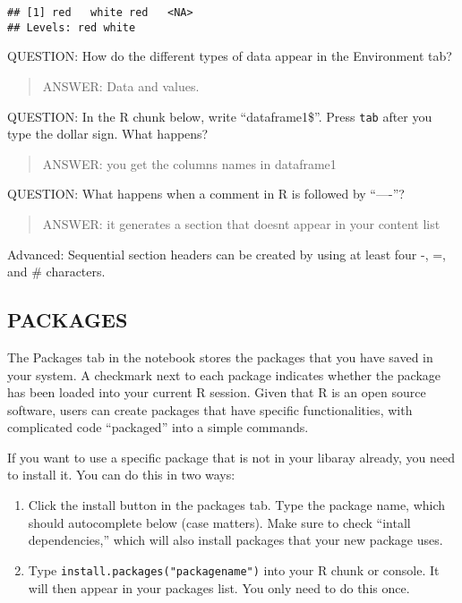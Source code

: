 \documentclass[]{article}
\begin{document}
\begin{verbatim}
## [1] red   white red   <NA> 
## Levels: red white
\end{verbatim}

QUESTION: How do the different types of data appear in the Environment
tab?

\begin{quote}
ANSWER: Data and values.
\end{quote}

QUESTION: In the R chunk below, write ``dataframe1\$''. Press
\texttt{tab} after you type the dollar sign. What happens?

\begin{quote}
ANSWER: you get the columns names in dataframe1
\end{quote}

QUESTION: What happens when a comment in R is followed by ``----''?

\begin{quote}
ANSWER: it generates a section that doesnt appear in your content list
\end{quote}

Advanced: Sequential section headers can be created by using at least
four -, =, and \# characters.

\subsection{PACKAGES}\label{packages}

The Packages tab in the notebook stores the packages that you have saved
in your system. A checkmark next to each package indicates whether the
package has been loaded into your current R session. Given that R is an
open source software, users can create packages that have specific
functionalities, with complicated code ``packaged'' into a simple
commands.

If you want to use a specific package that is not in your libaray
already, you need to install it. You can do this in two ways:

\begin{enumerate}
\def\labelenumi{\arabic{enumi}.}
\item
  Click the install button in the packages tab. Type the package name,
  which should autocomplete below (case matters). Make sure to check
  ``intall dependencies,'' which will also install packages that your
  new package uses.
\item
  Type \texttt{install.packages("packagename")} into your R chunk or
  console. It will then appear in your packages list. You only need to
  do this once.
\end{enumerate}
\end{document}
